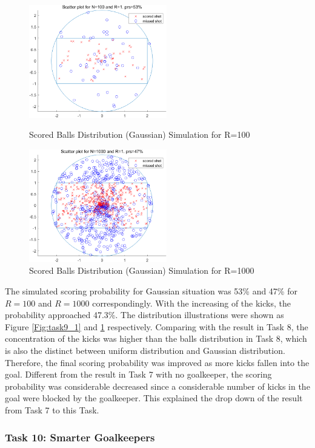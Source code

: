 \documentclass[11pt, a4paper]{article}
\begin{document}
\begin{figure}[htbp]
\centering
\begin{minipage}[t]{0.48\textwidth}
\centering
\includegraphics[width=6cm]{img/t9_1.png}
\caption{Scored Balls Distribution (Gaussian) Simulation for R=100}
\label{Fig:task9_1}
\end{minipage}
\begin{minipage}[t]{0.48\textwidth}
\centering
\includegraphics[width=6cm]{img/t9_2.png}
\caption{Scored Balls Distribution (Gaussian) Simulation for R=1000}
\label{Fig:task9_2}
\end{minipage}
\end{figure}

The simulated scoring probability for Gaussian situation was 53\% and 47\% for $R=100$ and $R=1000$ correspondingly. With the increasing of the kicks, the probability approached 47.3\%. The distribution illustrations were shown as Figure \ref{Fig:task9_1} and \ref{Fig:task9_2} respectively. Comparing with the result in Task 8, the concentration of the kicks was higher than the balls distribution in Task 8, which is also the distinct between uniform distribution and Gaussian distribution. Therefore, the final scoring probability was improved as more kicks fallen into the goal. Different from the result in Task 7 with no goalkeeper, the scoring probability was considerable decreased since a considerable number of kicks in the goal were blocked by the goalkeeper. This explained the drop down of the result from Task 7 to this Task.


\subsubsection{Task 10: Smarter Goalkeepers}
\end{document}
